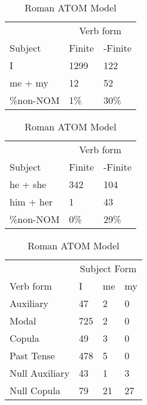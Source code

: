 \begin{table}[]
\caption{Roman ATOM Model}
\begin{minipage}{0.5\textwidth}
    \centering
    \begin{tabular}{@{}lll@{}}
        \toprule
         & \multicolumn{2}{c}{Verb form}\\
         \cline{2-3}
        Subject & Finite & -Finite \\
        \midrule
        I & 1299 & 122 \\
        me + my & 12 & 52 \\
        \hline
        \%non-NOM & 1\% & 30\% \\
        \bottomrule
    \end{tabular}
\end{minipage}
\begin{minipage}{0.5\textwidth}
    \centering
    \begin{tabular}{@{}lll@{}}
        \toprule
         & \multicolumn{2}{c}{Verb form}\\
         \cline{2-3}
        Subject & Finite & -Finite \\
        \midrule
        he + she & 342 & 104 \\
        him + her & 1 & 43 \\
        \hline
        \%non-NOM & 0\% & 29\% \\
        \bottomrule
    \end{tabular}
    \end{minipage}
    \begin{minipage}{0.5\textwidth}
    \centering
    \begin{tabular}{@{}llll@{}}
        \toprule
            &\multicolumn{3}{c}{Subject Form}\\
            \cline{2-4}
        Verb form & I & me & my \\
        \midrule
        Auxiliary & 47 & 2 & 0 \\
        Modal & 725 & 2 & 0 \\
        Copula & 49 & 3 & 0 \\
        Past Tense & 478 & 5 & 0 \\
        \hline
        Null Auxiliary & 43 & 1 & 3 \\
        Null Copula & 79 & 21 & 27 \\
        \bottomrule
    \end{tabular}

\end{minipage}
\end{table}
